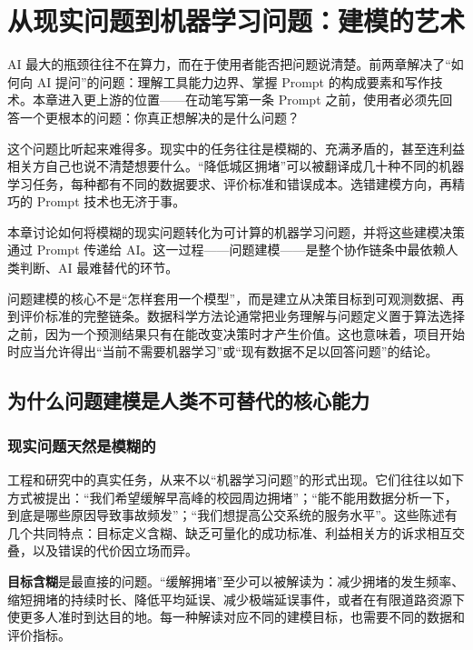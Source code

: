 ﻿\chapter{从现实问题到机器学习问题：建模的艺术}

AI 最大的瓶颈往往不在算力，而在于使用者能否把问题说清楚。前两章解决了“如何向 AI 提问”的问题：理解工具能力边界、掌握 Prompt 的构成要素和写作技术。本章进入更上游的位置——在动笔写第一条 Prompt 之前，使用者必须先回答一个更根本的问题：你真正想解决的是什么问题？

这个问题比听起来难得多。现实中的任务往往是模糊的、充满矛盾的，甚至连利益相关方自己也说不清楚想要什么。“降低城区拥堵”可以被翻译成几十种不同的机器学习任务，每种都有不同的数据要求、评价标准和错误成本。选错建模方向，再精巧的 Prompt 技术也无济于事。

本章讨论如何将模糊的现实问题转化为可计算的机器学习问题，并将这些建模决策通过 Prompt 传递给 AI。这一过程——问题建模——是整个协作链条中最依赖人类判断、AI 最难替代的环节。

问题建模的核心不是“怎样套用一个模型”，而是建立从决策目标到可观测数据、再到评价标准的完整链条。数据科学方法论通常把业务理解与问题定义置于算法选择之前，因为一个预测结果只有在能改变决策时才产生价值\cite{provost2013data}。这也意味着，项目开始时应当允许得出“当前不需要机器学习”或“现有数据不足以回答问题”的结论。

\section{为什么问题建模是人类不可替代的核心能力}

\subsection{现实问题天然是模糊的}

工程和研究中的真实任务，从来不以“机器学习问题”的形式出现。它们往往以如下方式被提出：“我们希望缓解早高峰的校园周边拥堵”；“能不能用数据分析一下，到底是哪些原因导致事故频发”；“我们想提高公交系统的服务水平”。这些陈述有几个共同特点：目标定义含糊、缺乏可量化的成功标准、利益相关方的诉求相互交叠，以及错误的代价因立场而异。

\textbf{目标含糊}是最直接的问题。“缓解拥堵”至少可以被解读为：减少拥堵的发生频率、缩短拥堵的持续时长、降低平均延误、减少极端延误事件，或者在有限道路资源下使更多人准时到达目的地。每一种解读对应不同的建模目标，也需要不同的数据和评价指标。

